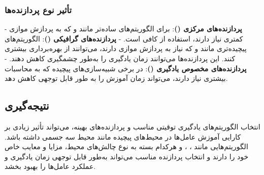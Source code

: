 \subsubsection{تأثیر نوع پردازنده‌ها}
- \textbf{پردازنده‌های مرکزی ()}: برای الگوریتم‌های ساده‌تر مانند  و  که به پردازش موازی کمتری نیاز دارند، استفاده از  کافی است.
- \textbf{پردازنده‌های گرافیکی ()}: الگوریتم‌های پیچیده‌تری مانند  و  که نیاز به پردازش موازی دارند، می‌توانند از  بهره‌برداری بیشتری کنند. این پردازنده‌ها می‌توانند زمان یادگیری را به‌طور چشمگیری کاهش دهند.
- \textbf{پردازنده‌های مخصوص یادگیری ()}: در برخی شبیه‌سازی‌های پیچیده که به محاسبات بیشتری نیاز دارند،  می‌تواند زمان آموزش را به طور قابل توجهی کاهش دهد.

\subsection{نتیجه‌گیری}
انتخاب الگوریتم‌های یادگیری توقیتی مناسب و پردازنده‌های بهینه، می‌تواند تأثیر زیادی بر کارایی آموزش عامل‌ها در محیط‌های پیچیده مانند محیط سه جسمی داشته باشد. الگوریتم‌هایی مانند ، ،  و  هرکدام بسته به نوع چالش‌های محیط، مزایا و معایب خاص خود را دارند و انتخاب پردازنده مناسب می‌تواند به‌طور قابل توجهی زمان یادگیری و عملکرد عامل‌ها را بهبود بخشد.
